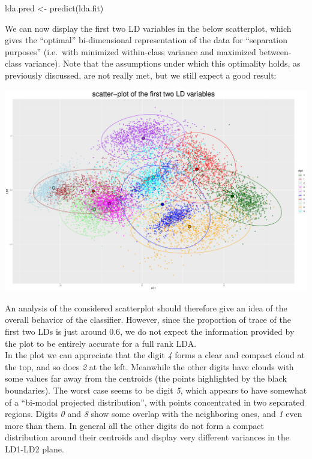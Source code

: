 \documentclass[
  letterpaper,
  DIV=11,
  numbers=noendperiod]{scrartcl}
\newenvironment{Shaded}{\begin{snugshade}}{\end{snugshade}}
\newcommand{\FunctionTok}[1]{\textcolor[rgb]{0.28,0.35,0.67}{#1}}
\newcommand{\NormalTok}[1]{\textcolor[rgb]{0.00,0.23,0.31}{#1}}
\newcommand{\OtherTok}[1]{\textcolor[rgb]{0.00,0.23,0.31}{#1}}
\begin{document}
\begin{Shaded}
\begin{Highlighting}[]
\NormalTok{lda.pred }\OtherTok{\textless{}{-}} \FunctionTok{predict}\NormalTok{(lda.fit)}
\end{Highlighting}
\end{Shaded}

We can now display the first two LD variables in the below scatterplot,
which gives the ``optimal'' bi-dimensional representation of the data
for ``separation purposes'' (i.e.~with minimized within-class variance
and maximized between-class variance). Note that the assumptions under
which this optimality holds, as previously discussed, are not really
met, but we still expect a good result:

\includegraphics{ProblemSet2_files/figure-pdf/unnamed-chunk-68-1.pdf}

An analysis of the considered scatterplot should therefore give an idea
of the overall behavior of the classifier. However, since the proportion
of trace of the first two LDs is just around \(0.6\), we do not expect
the information provided by the plot to be entirely accurate for a full
rank LDA.\\
In the plot we can appreciate that the digit \emph{4} forms a clear and
compact cloud at the top, and so does \emph{2} at the left. Meanwhile
the other digits have clouds with some values far away from the
centroids (the points highlighted by the black boundaries). The worst
case seems to be digit \emph{5}, which appears to have somewhat of a
``bi-modal projected distribution'', with points concentrated in two
separated regions. Digits \emph{0} and \emph{8} show some overlap with
the neighboring ones, and \emph{1} even more than them. In general all
the other digits do not form a compact distribution around their
centroids and display very different variances in the LD1-LD2 plane.
\end{document}
